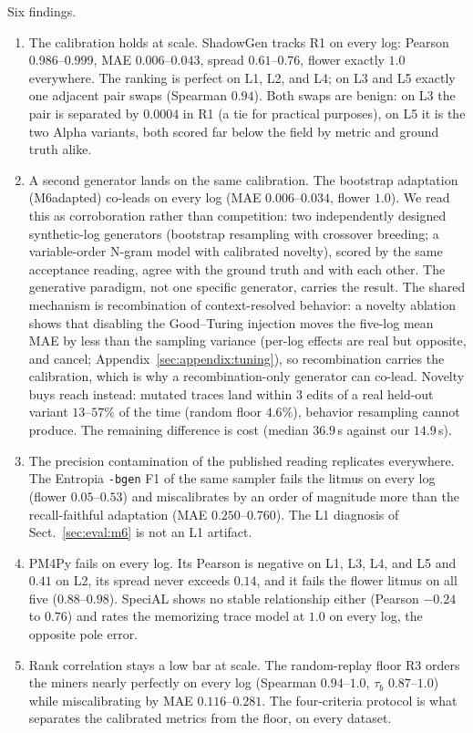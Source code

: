 \documentclass[runningheads]{llncs}
\begin{document}
Six findings.
\begin{enumerate}
  \item The calibration holds at scale. ShadowGen tracks R1 on every log: Pearson $0.986$--$0.999$, MAE $0.006$--$0.043$, spread $0.61$--$0.76$, flower exactly $1.0$ everywhere. The ranking is perfect on L1, L2, and L4; on L3 and L5 exactly one adjacent pair swaps (Spearman $0.94$). Both swaps are benign: on L3 the pair is separated by $0.0004$ in R1 (a tie for practical purposes), on L5 it is the two Alpha variants, both scored far below the field by metric and ground truth alike.
  \item A second generator lands on the same calibration. The bootstrap adaptation (M6adapted) co-leads on every log (MAE $0.006$--$0.034$, flower $1.0$). We read this as corroboration rather than competition: two independently designed synthetic-log generators (bootstrap resampling with crossover breeding; a variable-order N-gram model with calibrated novelty), scored by the same acceptance reading, agree with the ground truth and with each other. The generative paradigm, not one specific generator, carries the result. The shared mechanism is recombination of context-resolved behavior: a novelty ablation shows that disabling the Good--Turing injection moves the five-log mean MAE by less than the sampling variance (per-log effects are real but opposite, and cancel; Appendix~\ref{sec:appendix:tuning}), so recombination carries the calibration, which is why a recombination-only generator can co-lead. Novelty buys reach instead: mutated traces land within $3$ edits of a real held-out variant $13$--$57\%$ of the time (random floor $4.6\%$), behavior resampling cannot produce. The remaining difference is cost (median $36.9$\,s against our $14.9$\,s).
  \item The precision contamination of the published reading replicates everywhere. The Entropia \texttt{-bgen} F1 of the same sampler fails the litmus on every log (flower $0.05$--$0.53$) and miscalibrates by an order of magnitude more than the recall-faithful adaptation (MAE $0.250$--$0.760$). The L1 diagnosis of Sect.~\ref{sec:eval:m6} is not an L1 artifact.
  \item PM4Py fails on every log. Its Pearson is negative on L1, L3, L4, and L5 and $0.41$ on L2, its spread never exceeds $0.14$, and it fails the flower litmus on all five ($0.88$--$0.98$). SpeciAL shows no stable relationship either (Pearson $-0.24$ to $0.76$) and rates the memorizing trace model at $1.0$ on every log, the opposite pole error.
  \item Rank correlation stays a low bar at scale. The random-replay floor R3 orders the miners nearly perfectly on every log (Spearman $0.94$--$1.0$, $\tau_b$ $0.87$--$1.0$) while miscalibrating by MAE $0.116$--$0.281$. The four-criteria protocol is what separates the calibrated metrics from the floor, on every dataset.

\end{enumerate}
\end{document}
